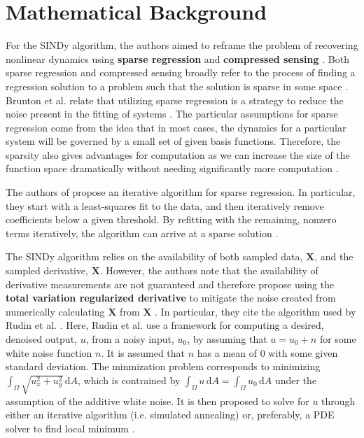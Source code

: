\documentclass[10pt]{paper}
\begin{document}

\section{Mathematical Background}
For the SINDy algorithm, the authors aimed to reframe the problem of recovering nonlinear dynamics using \textbf{sparse regression} and \textbf{compressed sensing} \cite{sindy}. Both sparse regression and compressed sensing broadly refer to the process of finding a regression solution to a problem such that the solution is sparse in some space \cite{sindy}. 
Brunton et al. relate that utilizing sparse regression is a strategy to reduce the noise present in the fitting of systems \cite{sindy}. The particular assumptions for sparse regression come from the idea that in most cases, the dynamics for a particular system will be governed by a small set of given basis functions. Therefore, the sparsity also gives advantages for computation as we can increase the size of the function space dramatically without needing significantly more computation \cite{sindy}. 

The authors of \cite{sindy} propose an iterative algorithm for sparse regression. In particular, they start with a least-squares fit to the data, and then iteratively remove coefficients below a given threshold. By refitting with the remaining, nonzero terms iteratively, the algorithm can arrive at a sparse solution \cite{sindy}. 

The SINDy algorithm relies on the availability of both sampled data, $\mathbf X$, and the sampled derivative, $\mathbf{\dot X}$. However, the authors note that the availability of derivative measurements are not guaranteed and therefore propose using the \textbf{total variation regularized derivative} to mitigate the noise created from numerically calculating $\mathbf {\dot X}$ from $\mathbf X$ \cite{sindy}. In particular, they cite the algorithm used by Rudin et al. \cite{rudin}. 
Here, Rudin et al. use a framework for computing a desired, denoised output, $u$, from a noisy input, $u_0$, by assuming that $u = u_0 + n$ for some white noise function $n$. It is assumed that $n$ has a mean of $0$ with some given standard deviation. 
The minmization problem corresponds to minimizing $\int_\Omega \sqrt{u_x^2 + u_y^2} \, \mathrm d A$, which is contrained by $\int_\Omega u \, \mathrm dA = \int_\Omega u_0 \, \mathrm dA$ under the assumption of the additive white noise. It is then proposed to solve for $u$ through either an iterative algorithm (i.e. simulated annealing) or, preferably, a PDE solver to find local minimum \cite{rudin}. 
\end{document}
